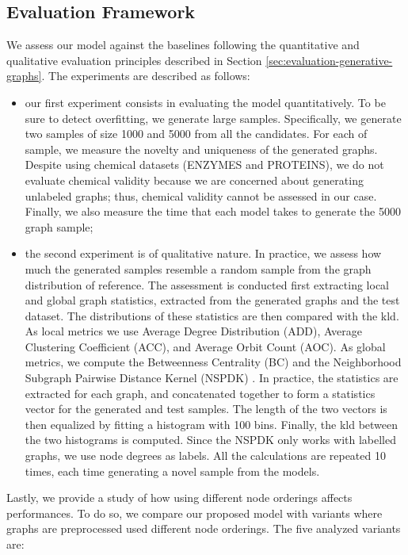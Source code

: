 \subsection{Evaluation Framework}
We assess our model against the baselines following the quantitative and qualitative evaluation principles described in Section \ref{sec:evaluation-generative-graphs}. The experiments are described as follows:
\begin{itemize}
    \item our first experiment consists in evaluating the model quantitatively. To be sure to detect overfitting, we generate large samples. Specifically, we generate two samples of size 1000 and 5000 from all the candidates. For each of sample, we measure the novelty and uniqueness of the generated graphs. Despite using chemical datasets (ENZYMES and PROTEINS), we do not evaluate chemical validity because we are concerned about generating unlabeled graphs; thus, chemical validity cannot be assessed in our case. Finally, we also measure the time that each model takes to generate the 5000 graph sample;
    \item the second experiment is of qualitative nature. In practice, we assess how much the generated samples resemble a random sample from the graph distribution of reference. The assessment is conducted first extracting local and global graph statistics, extracted from the generated graphs and the test dataset. The distributions of these statistics are then compared with the \gls{kld}. As local metrics we use Average Degree Distribution (ADD), Average Clustering Coefficient (ACC), and Average Orbit Count (AOC). As global metrics, we compute the Betweenness Centrality (BC) and the Neighborhood Subgraph Pairwise Distance Kernel (NSPDK) \cite{costa2010nspdk}. In practice, the statistics are extracted for each graph, and concatenated together to form a statistics vector for the generated and test samples. The length of the two vectors is then equalized by fitting a histogram with 100 bins. Finally, the \gls{kld} between the two histograms is computed. Since the NSPDK only works with labelled graphs, we use node degrees as labels. All the calculations are repeated 10 times, each time generating a novel sample from the models.
\end{itemize}
Lastly, we provide a study of how using different node orderings affects performances. To do so, we compare our proposed model with variants where graphs are preprocessed used different node orderings. The five analyzed variants are:
